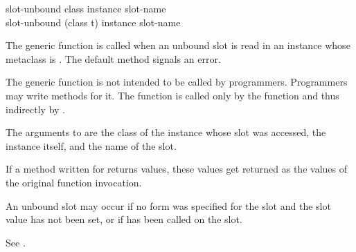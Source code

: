\begin{defun}
slot-unbound class instance slot-name \\
slot-unbound (class t) instance slot-name

The generic function  is called when an
unbound slot is read in an instance whose metaclass is 
.
The default method signals an error.

The generic function  is not intended to be called
by programmers.  Programmers may write methods for it.
The function  is called only by the function
 and thus indirectly by .





The arguments to  are the class of the instance
whose slot was accessed, the instance itself, and the name of the
slot.


If a method written for  returns values, these
values get returned as the values of the original function invocation.


An unbound slot may occur if no  form was
specified for the slot and the slot value has not been set, or if 
 has been called on the slot.

See .
\end{defun}



